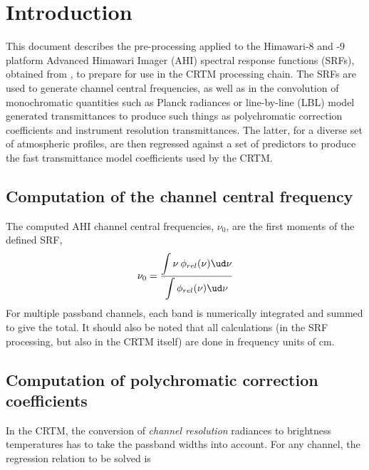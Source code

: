 \section{Introduction}
This document describes the pre-processing applied to the Himawari-8 and -9 platform Advanced Himawari Imager (AHI)  spectral response functions (SRFs), obtained from \cite{Himawari-8_SRF_Data,Himawari-9_SRF_Data}, to prepare for use in the CRTM processing chain. The SRFs are used to generate channel central frequencies, as well as in the convolution of monochromatic quantities such as Planck radiances or line-by-line (LBL) model generated transmittances to produce such things as polychromatic correction coefficients and instrument resolution transmittances. The latter, for a diverse set of atmospheric profiles, are then regressed against a set of predictors to produce the fast transmittance model coefficients used by the CRTM.

\subsection{Computation of the channel central frequency}
The computed AHI channel central frequencies, $\nu_0$, are the first moments of the defined SRF,
\begin{equation}
  \nu_0 = \frac{\displaystyle\int{\nu\:\phi_{rel}(\nu)\ud \nu}}{\displaystyle\int{\phi_{rel}(\nu)\ud \nu}}
\end{equation}
For multiple passband channels, each band is numerically integrated and summed to give the total. It should also be noted that all calculations (in the SRF processing, but also in the CRTM itself) are done in frequency units of cm.


\subsection{Computation of polychromatic correction coefficients}
In the CRTM, the conversion of \emph{channel resolution} radiances to brightness temperatures has to take the passband widths into account. For any channel, the regression relation to be solved is

